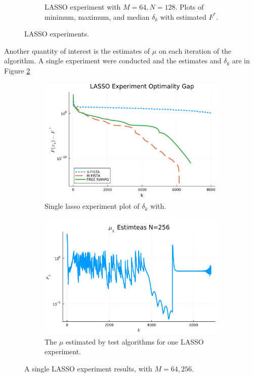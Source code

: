 \documentclass[12pt]{article}
\begin{document}
\begin{figure}[H]
\begin{subfigure}[b]{0.47\textwidth}
                    \caption{LASSO experiment with $M = 64, N = 128$. Plots of minimum, maximum, and median $\delta_k$ with estimated $F^*$. }
                \end{subfigure}
                \caption{LASSO experiments. }
                \label{fig:batched-lasso}
            \end{figure}
            \par
            Another quantity of interest is the estimates of $\mu$ on each iteration of the algorithm. 
            A single experiment were conducted and the estimates and $\delta_k$ are in Figure \ref{fig:single-lass-mu-estimates}
            \begin{figure}[H]
                \begin{subfigure}[b]{0.47\textwidth}
                    \includegraphics[width=\textwidth]{assets/lasso_loss_256.png}
                    \caption{Single lasso experiment plot of $\delta_k$ with.  }
                \end{subfigure}
                \hfill
                \begin{subfigure}[b]{0.47\textwidth}
                    \includegraphics[width=\textwidth]{assets/lasso_sc_estimates_256.png}
                    \caption{The $\mu$ estimated by test algorithms for one LASSO experiment. }
                \end{subfigure}
                \caption{A single LASSO experiment results, with $M = 64, 256$. }
                \label{fig:single-lass-mu-estimates}
            \end{figure}
\end{document}
